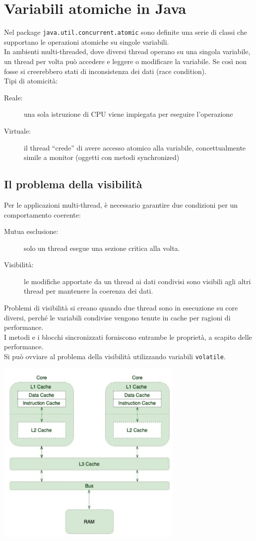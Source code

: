 \chapter{Variabili atomiche in Java}
Nel package \verb#java.util.concurrent.atomic# sono definite una serie di classi che supportano le operazioni atomiche su singole variabili.
\\In ambienti multi-threaded, dove diversi thread operano su una singola variabile, un thread per volta può accedere e leggere o modificare la variabile. Se così non fosse si creerebbero stati di inconsistenza dei dati (race condition).
\\Tipi di atomicità:
\begin{description}
    \item[Reale:] una sola istruzione di CPU viene impiegata per eseguire l'operazione
    \item[Virtuale:] il thread “crede” di avere accesso atomico alla variabile, concettualmente simile a monitor (oggetti con metodi synchronized)
\end{description}

\section{Il problema della visibilità}
Per le applicazioni multi-thread, è necessario garantire due condizioni per un comportamento coerente:
\begin{description}
    \item[Mutua esclusione:] solo un thread esegue una sezione critica alla volta.
    \item[Visibilità:] le modifiche apportate da un thread ai dati condivisi sono visibili agli altri thread per mantenere la coerenza dei dati.
\end{description}
Problemi di visibilità si creano quando due thread sono in esecuzione su core diversi, perché le variabili condivise vengono tenute in cache per ragioni di performance.
\\I metodi e i blocchi sincronizzati forniscono entrambe le proprietà, a scapito delle performance.
\\Si può ovviare al problema della visibilità utilizzando variabili \verb#volatile#.
\begin{center}
    \includegraphics[width=0.675\textwidth]{img/concorrenza177.jpg}
\end{center}

